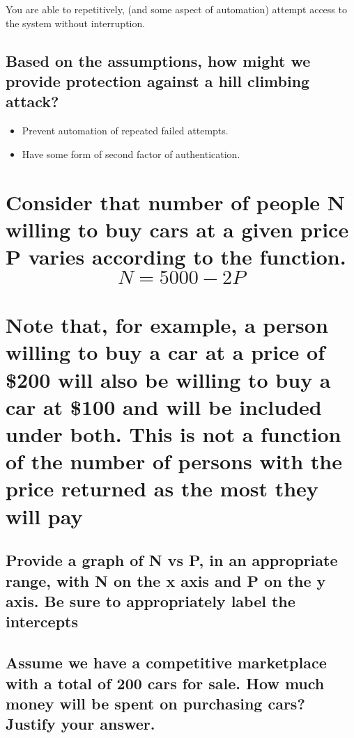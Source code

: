 \documentclass{article}
\begin{document}
You are able to repetitively, (and some aspect of automation) attempt access to the system without interruption. 

\subsection[Hill Climbing and presentation]{Based on the assumptions, how might we provide protection against a hill climbing attack?}

\begin{itemize}
\item Prevent automation of repeated failed attempts.
\item Have some form of second factor of authentication. 
\end{itemize}

\section[Buying Cars]{Consider that number of people N willing to buy cars at a given price P varies according to the
function. \[N=5000-2P\] \\
Note that, for example, a person willing to buy a car at a price of \$200 will also be willing to buy a car at \$100 and will be included under both. This is not a function of the number of persons with the price returned as the most they will pay}

\subsection[Graph]{Provide a graph of N vs P, in an appropriate range, with N on the x axis and P on the y axis.
Be sure to appropriately label the intercepts}


\subsection[competitive]{Assume we have a competitive marketplace with a total of 200 cars for sale. How much money
will be spent on purchasing cars? Justify your answer.}
\end{document}
